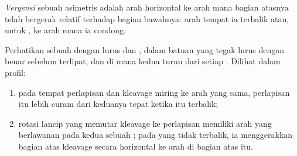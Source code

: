 \begin{definition}[Vergensi]\label{def:b1:faults-folds-fabrics:vergence}
\emph{Vergensi} sebuah  asimetris adalah arah horizontal ke arah mana bagian atasnya telah bergerak relatif terhadap bagian bawahnya: arah tempat ia terbalik atau, untuk , ke arah mana ia condong.
\end{definition}

\begin{proposition}\label{prop:b1:faults-folds-fabrics:cleavage-bedding}
Perhatikan sebuah  dengan  lurus dan , dalam batuan yang tegak lurus dengan benar sebelum terlipat, dan di mana kedua  turun dari setiap  . Dilihat dalam profil:
\begin{enumerate}[label=(\alph*)]
  \item pada  tempat perlapisan dan kleavage miring ke arah yang sama, perlapisan itu lebih curam dari keduanya tepat ketika  itu terbalik;
  \item rotasi lancip yang memutar kleavage ke perlapisan memiliki arah yang berlawanan pada kedua  sebuah ; pada  yang tidak terbalik, ia menggerakkan bagian atas kleavage secara horizontal ke arah   di bagian atas  itu.
\end{enumerate}
\end{proposition}

